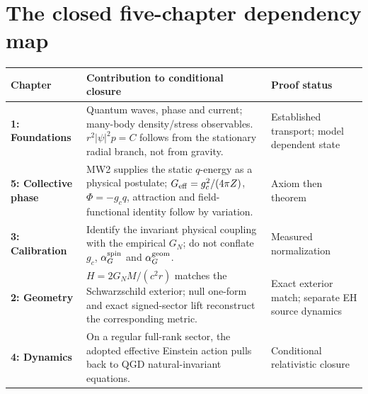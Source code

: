 \documentclass[11pt,a4paper]{article}
\theoremstyle{remark}\newtheorem{remark}[theorem]{Remark}
\begin{document}
\section{The closed five-chapter dependency map}\label{sec:v30-map}
\begin{center}\small
\begin{tabularx}{\linewidth}{@{}p{22mm}X p{32mm}@{}}\toprule
\textbf{Chapter}&\textbf{Contribution to conditional closure}&\textbf{Proof status}\\\midrule
\textbf{1: Foundations}&Quantum waves, phase and current; many-body density/stress observables. $r^2|\psi|^2p=C$ follows from the stationary radial branch, not from gravity.&Established transport; model dependent state\\
\textbf{5: Collective phase}&MW2 supplies the static $q$-energy as a physical postulate; $G_{\rm eff}=g_c^2/(4\pi Z)$, $\Phi=-g_cq$, attraction and field-functional identity follow by variation.&Axiom then theorem\\
\textbf{3: Calibration}&Identify the invariant physical coupling with the empirical $G_N$; do not conflate $g_c$, $\alpha_G^{\rm spin}$ and $\alpha_G^{\rm geom}$.&Measured normalization\\
\textbf{2: Geometry}&$H=2G_NM/(c^2r)$ matches the Schwarzschild exterior; null one-form and exact signed-sector lift reconstruct the corresponding metric.&Exact exterior match; separate EH source dynamics\\
\textbf{4: Dynamics}&On a regular full-rank sector, the adopted effective Einstein action pulls back to QGD natural-invariant equations.&Conditional relativistic closure\\\bottomrule
\end{tabularx}
\end{center}
\end{document}
